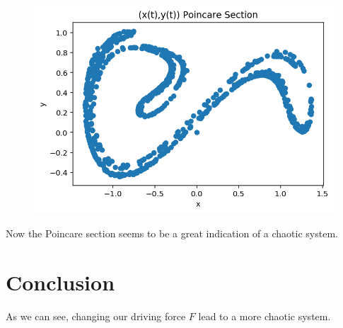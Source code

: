 \documentclass{article}
\begin{document}
\begin{figure}[h!]
\includegraphics[scale=0.4]{poincare8.png}
\end{figure}

Now the Poincare section seems to be a great indication of a chaotic system.

\section{Conclusion}
As we can see, changing our driving force $F$ lead to a more chaotic system.
\end{document}
